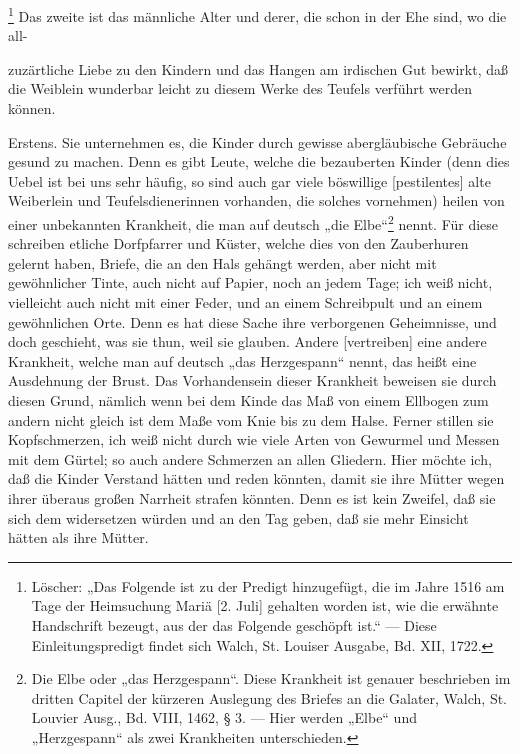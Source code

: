 \footnote{Löscher: „Das Folgende ist zu der Predigt hinzugefügt, die im Jahre 1516 am Tage der Heimsuchung Mariä [2. Juli] gehalten worden ist, wie die erwähnte Handschrift bezeugt, aus der das Folgende geschöpft ist.“ — Diese Einleitungspredigt findet sich Walch, St. Louiser Ausgabe, Bd. XII, 1722.} Das zweite ist das männliche Alter und derer, die schon in der Ehe sind, wo die all-

zuzärtliche Liebe zu den Kindern und das Hangen am irdischen Gut bewirkt, daß die Weiblein wunderbar leicht zu diesem Werke des Teufels verführt werden können.

Erstens. Sie unternehmen es, die Kinder durch gewisse abergläubische Gebräuche gesund zu machen. Denn es gibt Leute, welche die bezauberten Kinder (denn dies Uebel ist bei uns sehr häufig, so sind auch gar viele böswillige [pestilentes] alte Weiberlein und Teufelsdienerinnen vorhanden, die solches vornehmen) heilen von einer unbekannten Krankheit, die man auf deutsch „die Elbe“\footnote{Die Elbe oder „das Herzgespann“. Diese Krankheit ist genauer beschrieben im dritten Capitel der kürzeren Auslegung des Briefes an die Galater, Walch, St. Louvier Ausg., Bd. VIII, 1462, § 3. — Hier werden „Elbe“ und „Herzgespann“ als zwei Krankheiten unterschieden.} nennt. Für diese schreiben etliche Dorfpfarrer und Küster, welche dies von den Zauberhuren gelernt haben, Briefe, die an den Hals gehängt werden, aber nicht mit gewöhnlicher Tinte, auch nicht auf Papier, noch an jedem Tage; ich weiß nicht, vielleicht auch nicht mit einer Feder, und an einem Schreibpult und an einem gewöhnlichen Orte. Denn es hat diese Sache ihre verborgenen Geheimnisse, und doch geschieht, was sie thun, weil sie glauben. Andere [vertreiben] eine andere Krankheit, welche man auf deutsch „das Herzgespann“ nennt, das heißt eine Ausdehnung der Brust. Das Vorhandensein dieser Krankheit beweisen sie durch diesen Grund, nämlich wenn bei dem Kinde das Maß von einem Ellbogen zum andern nicht gleich ist dem Maße vom Knie bis zu dem Halse. Ferner stillen sie Kopfschmerzen, ich weiß nicht durch wie viele Arten von Gewurmel und Messen mit dem Gürtel; so auch andere Schmerzen an allen Gliedern. Hier möchte ich, daß die Kinder Verstand hätten und reden könnten, damit sie ihre Mütter wegen ihrer überaus großen Narrheit strafen könnten. Denn es ist kein Zweifel, daß sie sich dem widersetzen würden und an den Tag geben, daß sie mehr Einsicht hätten als ihre Mütter.

